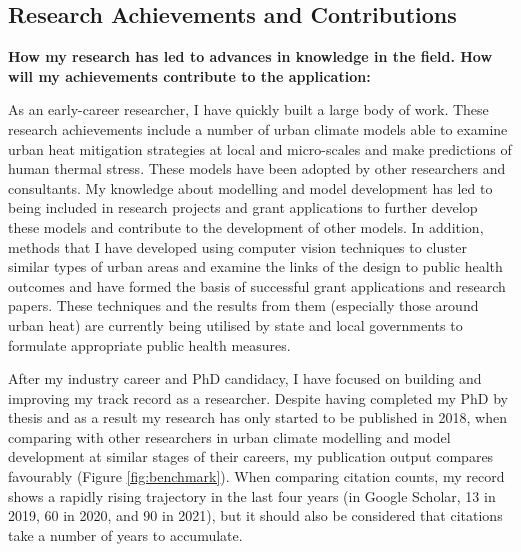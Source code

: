 \subsection*{\TitleFont Research Achievements and Contributions}

\textbf{How my research has led to advances in knowledge in the field. How will my achievements contribute to the application:}


As an early-career researcher, I have quickly built a large body of work. These research achievements include a number of urban climate models able to examine urban heat mitigation strategies at local and micro-scales and make predictions of human thermal stress. These models have been adopted by other researchers and consultants. My knowledge about modelling and model development has led to being included in research projects and grant applications to further develop these models and contribute to the development of other models. In addition, methods that I have developed using computer vision techniques to cluster similar types of urban areas and examine the links of the design to public health outcomes and have formed the basis of successful grant applications and research papers. These techniques and the results from them (especially those around urban heat) are currently being utilised by state and local governments to formulate appropriate public health measures.

After my industry career and PhD candidacy, I have focused on building and improving my track record as a researcher. Despite having completed my PhD by thesis and as a result my research has only started to be published in 2018, when comparing with other researchers in urban climate modelling and model development at similar stages of their careers, my publication output compares favourably (Figure \ref{fig:benchmark}). When comparing citation counts, my record shows a rapidly rising trajectory in the last four years (in Google Scholar, 13 in 2019, 60 in 2020, and 90 in 2021), but it should also be considered that citations take a number of years to accumulate.



